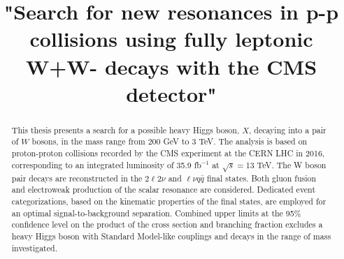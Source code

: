 \documentclass[PhD,binding=0.6cm]{../sapthesis}
\title{"Search for new resonances in p-p collisions using fully leptonic W+W- decays with the CMS detector" }
\begin{document}
\newcommand{\aMC}{\textsc{MadGraph}\xspace}
\newcommand{\qqbar}{$q \bar{q}$}
\newcommand{\POWHEG} {{\textsc{powheg}}\xspace}

\frontmatter

\maketitle

\dedication{  dedica a...}



\begin{abstract}
This thesis presents a search for a possible heavy Higgs boson, $X$, decaying into a pair of $W$
bosons, in the mass range from 200 GeV to 3 TeV. The analysis is based on proton-proton 
collisions recorded by the CMS experiment at the CERN LHC in 2016, corresponding to an integrated luminosity of 
35.9 fb$^{-1}$  at $\sqrt{s}=$13 TeV. The W boson pair decays are reconstructed in the $2\ell 2\nu$  and $\ell\nu q \bar{q}$ final states. 
Both gluon fusion and electroweak production of the scalar resonance are considered. 
Dedicated event categorizations, based on the kinematic properties of the final states, are employed for an
optimal signal-to-background separation. 
Combined upper limits at the 95\% confidence level on the product of the cross section and branching fraction excludes a heavy Higgs boson  with Standard Model-like couplings and decays in the range of mass investigated. 
\end{abstract}


\tableofcontents

\end{document}
